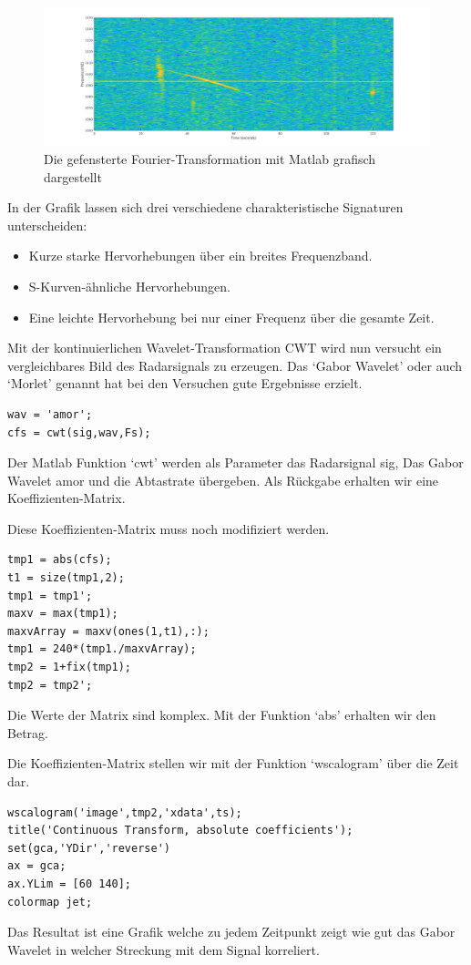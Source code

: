 \begin{refsection}
\begin{figure}[h]
	\centering
	\includegraphics[width=\linewidth]{papers/meteor/images/signal_gfft.png}
	\caption{Die gefensterte Fourier-Transformation mit Matlab grafisch dargestellt}
	\label{fig:signalmitgfft}
\end{figure}
In der Grafik lassen sich drei verschiedene charakteristische Signaturen unterscheiden:
\begin{itemize}
	\item Kurze starke Hervorhebungen über ein breites Frequenzband.
	\item S-Kurven-ähnliche  Hervorhebungen.
	\item Eine leichte Hervorhebung bei nur einer Frequenz über die gesamte Zeit.
\end{itemize}
 
Mit der kontinuierlichen Wavelet-Transformation CWT wird nun versucht ein vergleichbares Bild des Radarsignals zu erzeugen.
Das `Gabor Wavelet' oder auch `Morlet' genannt hat bei den Versuchen gute Ergebnisse erzielt.
\begin{lstlisting}
wav = 'amor';
cfs = cwt(sig,wav,Fs);
\end{lstlisting}
Der Matlab Funktion `cwt' werden als Parameter das Radarsignal sig, Das Gabor Wavelet amor und die Abtastrate übergeben.
Als Rückgabe erhalten wir eine Koeffizienten-Matrix.

Diese Koeffizienten-Matrix muss noch modifiziert werden.
\begin{lstlisting}
tmp1 = abs(cfs);
t1 = size(tmp1,2);
tmp1 = tmp1';
maxv = max(tmp1);
maxvArray = maxv(ones(1,t1),:);
tmp1 = 240*(tmp1./maxvArray);
tmp2 = 1+fix(tmp1);
tmp2 = tmp2';
\end{lstlisting}
Die Werte der Matrix sind komplex.
Mit der Funktion `abs' erhalten wir den Betrag.

\newpage
Die Koeffizienten-Matrix stellen wir mit der Funktion `wscalogram' über die Zeit dar.
\begin{lstlisting}
wscalogram('image',tmp2,'xdata',ts);
title('Continuous Transform, absolute coefficients');
set(gca,'YDir','reverse')
ax = gca;
ax.YLim = [60 140];
colormap jet;
\end{lstlisting}
Das Resultat ist eine Grafik welche zu jedem Zeitpunkt zeigt wie gut das Gabor Wavelet in welcher Streckung mit dem Signal korreliert. 


\end{refsection}
